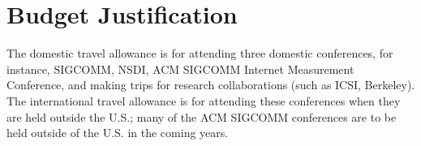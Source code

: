 \pagebreak

\section{Budget Justification}


The domestic travel allowance is for attending three domestic
conferences, for instance, SIGCOMM, NSDI, ACM SIGCOMM Internet
Measurement Conference, and making trips for research collaborations
(such as ICSI, Berkeley).  The international travel allowance is for
attending these conferences when they are held outside the U.S.; many of
the ACM SIGCOMM conferences are to be held outside of the U.S. in the
coming years.
